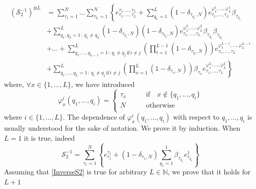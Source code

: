 \documentclass[10pt]{article}
\numberwithin{equation}{section}
\numberwithin{equation}{subsection}
\begin{document}
    \begin{equation}\label{InverseS2}
    	\begin{split}
    		\left(\mathcal{S}_{2}^{-1}\right)^{\otimes L}&=\sum_{\tau_{1}=1}^{N}\ldots\sum_{\tau_{L}=1}^{N}\left\{e_{\tau_{1},\ldots,\tau_{L}}^{\tau_{1},\ldots,\tau_{L}}+\sum_{q_{1}=1}^{L}(1-\delta_{\tau_{q_{1}},N})e_{\tau_{1},\ldots,\tau_{L}}^{\varphi_{1}^{1},\ldots,\varphi_{L}^{1}}\beta_{\tau_{q_{1}}}\right. 
    		\\&+\left. \sum_{q_{1},q_{2}=1\,:\,q_{1}\neq q_{2}}^{L}(1-\delta_{\tau_{q_{1}},N})(1-\delta_{\tau_{q_{2}},N})e^{\varphi_{1}^{2},\ldots,\varphi_{L}^{2}}_{\tau_{1},\ldots,\tau_{L}}\beta_{\tau_{q_{1}}}\beta_{\tau_{q_{2}}}\right.
    		\\&+\left.
    		\ldots+	\sum_{q_{1},\ldots,q_{L-1}=1\,:\,q_{i}\neq q_{j}\,\text{if}\,i\neq j}^{L}\left(\prod_{t=1}^{L-1}(1-\delta_{\tau_{q_{t}},N})\right)e_{\tau_{1},\ldots,\tau_{L}}^{\varphi_{1}^{L-1},\ldots,\varphi_{L}^{L-1}}
    		\right. \\&+ \left. 
    		\sum_{q_{1},\ldots,q_{L}=1\,:\,q_{i}\neq q_{j}\,\text{if}\,i\neq j}^{L}\left(\prod_{x=1}^{L}(1-\delta_{\tau_{x},N})\right)\beta_{\tau_{x}}e_{\tau_{1},\ldots,\tau_{L}}^{\varphi_{1}^{L},\ldots,\varphi_{L}^{L}} \right\}
    	\end{split}
    \end{equation}
where, $\forall x\in\{1,\ldots,L\}$, we have introduced
\begin{equation}
	\varphi_{x}^{i}(q_{1},\ldots,q_{i})=\begin{cases}
		\tau_{x}\qquad &\text{if}\quad x\notin\{q_{1},\ldots,q_{i}\}\\
		N\qquad &\text{otherwise}\\
	\end{cases}
\end{equation}
where $i\in\{1,\ldots,L\}$. The dependence of $\varphi_{x}^{i}(q_{1},\ldots,q_{i})$ with respect to $q_{1},\ldots,q_{i}$ is usually understood for the sake of notation.
    We prove it by induction. When $L=1$ it is true, indeed
    \begin{equation}
    	\mathcal{S}_{2}^{-1}=\sum_{\tau_{1}=1}^{N}\left\{e_{\tau_{1}}^{\tau_{1}}+(1-\delta_{\tau_{1},N})\sum_{q_{1}=1}^{1}\beta_{\tau_{q_{1}}}e_{\tau_{q_{1}}}^{1}\right\}
    \end{equation}
    Assuming that \eqref{InverseS2} is true for arbitrary $L\in \mathbb{N}$, we prove that it holds for $L+1$
\end{document}
